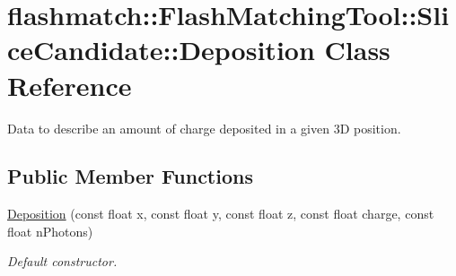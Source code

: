 \hypertarget{classflashmatch_1_1FlashMatchingTool_1_1SliceCandidate_1_1Deposition}{}\section{flashmatch\+:\+:Flash\+Matching\+Tool\+:\+:Slice\+Candidate\+:\+:Deposition Class Reference}
\label{classflashmatch_1_1FlashMatchingTool_1_1SliceCandidate_1_1Deposition}


Data to describe an amount of charge deposited in a given 3D position.  


\subsection*{Public Member Functions}
\begin{DoxyCompactItemize}
\item 
\hyperlink{classflashmatch_1_1FlashMatchingTool_1_1SliceCandidate_1_1Deposition_a1a82b8b017a69608daf16cd067c6e991}{Deposition} (const float x, const float y, const float z, const float charge, const float n\+Photons)
\begin{DoxyCompactList}\small\item\em Default constructor. \end{DoxyCompactList}\end{DoxyCompactItemize}
